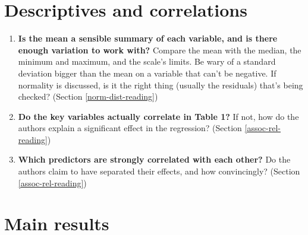 \documentclass[
]{book}
\providecommand{\tightlist}{%
  \setlength{\itemsep}{0pt}\setlength{\parskip}{0pt}}
\begin{document}
\section{Descriptives and correlations}\label{descriptives-and-correlations}

\begin{enumerate}
\def\labelenumi{\arabic{enumi}.}
\setcounter{enumi}{11}
\tightlist
\item
  \textbf{Is the mean a sensible summary of each variable, and is there enough variation to work with?} Compare the mean with the median, the minimum and maximum, and the scale's limits. Be wary of a standard deviation bigger than the mean on a variable that can't be negative. If normality is discussed, is it the right thing (usually the residuals) that's being checked? (Section \ref{norm-dist-reading})
\item
  \textbf{Do the key variables actually correlate in Table 1?} If not, how do the authors explain a significant effect in the regression? (Section \ref{assoc-rel-reading})
\item
  \textbf{Which predictors are strongly correlated with each other?} Do the authors claim to have separated their effects, and how convincingly? (Section \ref{assoc-rel-reading})
\end{enumerate}

\section{Main results}\label{main-results}
\end{document}
